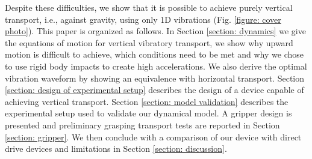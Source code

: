 Despite these difficulties, we show that it is possible to achieve purely vertical transport, i.e., against gravity, using only 1D vibrations (Fig. \ref{figure: cover photo}). 
%
This paper is organized as follows. 
%
In Section \ref{section: dynamics} we give the equations of motion for vertical vibratory transport, we show why upward motion is difficult to achieve, which conditions need to be met and why we chose to use rigid body impacts to create high accelerations.
%
We also derive the optimal vibration waveform by showing an equivalence with horizontal transport.
%
Section \ref{section: design of experimental setup} describes the design of a device capable of achieving vertical transport.
%
Section \ref{section: model validation} describes the experimental setup used to validate our dynamical model.
%
A gripper design is presented and preliminary grasping transport tests are reported in Section \ref{section: gripper}.
%
We then conclude with a comparison of our device  with direct drive devices and limitations in Section \ref{section: discussion}.
